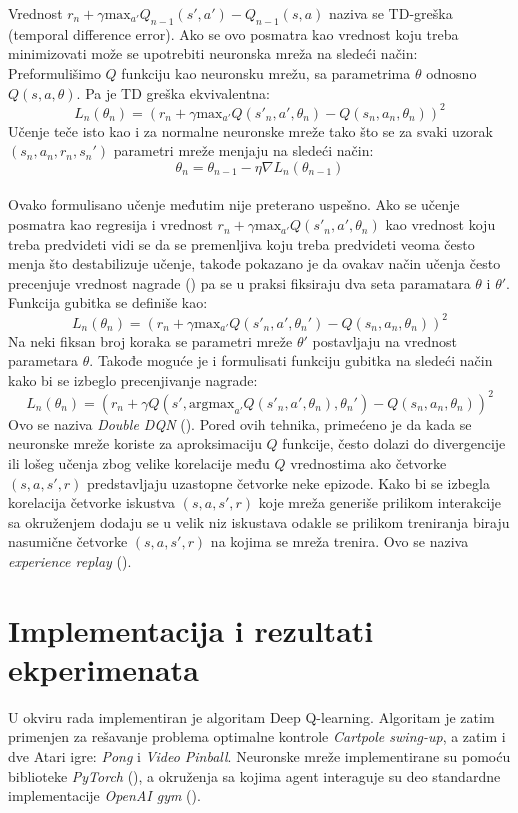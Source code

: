 \documentclass[a4paper,fleqn,12pt]{JMThesis}
\newcommand{\latin}{\fontencoding{T1}\selectfont\selectlanguage{english}}
\theoremstyle{plain}
\theoremstyle{definition}
\theoremstyle{definition}
\begin{document}
Vrednost $r_n + \gamma \text{max}_{a'}Q_{n-1}(s',a') - Q_{n-1}(s,a)$ naziva se TD-greška (temporal difference error). Ako se ovo
posmatra kao vrednost koju treba minimizovati može se upotrebiti neuronska mreža na sledeći način:
Preformulišimo $Q$ funkciju kao neuronsku mrežu, sa parametrima $\theta$ odnosno $Q(s,a,\theta)$. Pa je TD greška ekvivalentna:
\[L_n(\theta_n) = (r_n + \gamma \text{max}_{a'}Q(s'_n,a',\theta_{n}) - Q(s_n,a_n,\theta_{n}))^2 \]
Učenje teče isto kao i za normalne neuronske mreže tako što se za svaki uzorak $(s_n,a_n,r_n,s_n')$ parametri mreže menjaju na sledeći način:
\[ \theta_n = \theta_{n-1} - \eta  \nabla L_n(\theta_{n-1}) \]
\medskip\\
Ovako formulisano učenje međutim nije preterano uspešno. Ako se učenje posmatra kao regresija i vrednost $r_n + \gamma \text{max}_{a'}Q(s'_n,a',\theta_{n})$ 
kao vrednost koju treba predvideti vidi se da se premenljiva koju treba predvideti veoma često menja što destabilizuje učenje, takođe
pokazano je da ovakav način učenja često precenjuje vrednost nagrade (\latin \cite{van2016deep}) pa
se u praksi fiksiraju dva seta paramatara $\theta$ i $\theta'$. Funkcija gubitka se definiše kao:
\[L_n(\theta_n) = (r_n + \gamma \text{max}_{a'}Q(s'_n,a',\theta_n') - Q(s_n,a_n,\theta_n))^2 \]
Na neki fiksan broj koraka se parametri mreže $\theta'$ postavljaju na vrednost parametara $\theta$.
Takođe moguće je i formulisati funkciju gubitka na sledeći način kako bi se izbeglo precenjivanje nagrade:
\[L_n(\theta_n) = (r_n + \gamma Q(s',\text{argmax}_{a'}Q(s'_n,a',\theta_n),\theta_n') - Q(s_n,a_n,\theta_n))^2 \]
Ovo se naziva \textit{Double DQN} (\latin \cite{van2016deep}).
Pored ovih tehnika, primećeno je da kada se neuronske mreže koriste za aproksimaciju $Q$ funkcije, često dolazi do divergencije ili
lošeg učenja zbog velike korelacije među $Q$ vrednostima ako četvorke $(s,a,s',r)$ predstavljaju uzastopne četvorke neke epizode.
Kako bi se izbegla korelacija četvorke iskustva $(s,a,s',r)$ koje mreža generiše prilikom interakcije sa okruženjem dodaju se 
u velik niz iskustava odakle se prilikom treniranja biraju nasumične četvorke $(s,a,s',r)$ na kojima se mreža trenira. Ovo se naziva
\textit{experience replay} (\latin \cite{mnih2015human}).
\chapter{Implementacija i rezultati ekperimenata}
U okviru rada implementiran je algoritam Deep Q-learning. Algoritam je zatim primenjen za rešavanje problema optimalne kontrole
\textit{Cartpole swing-up}, a zatim i dve Atari igre: \textit{Pong} i \textit{Video Pinball}. Neuronske mreže implementirane su
pomoću biblioteke \textit{PyTorch} (\latin \cite{NEURIPS2019_9015}), a okruženja sa kojima agent interaguje su deo standardne
implementacije \textit{OpenAI gym} (\latin \cite{1606.01540}).
\end{document}
